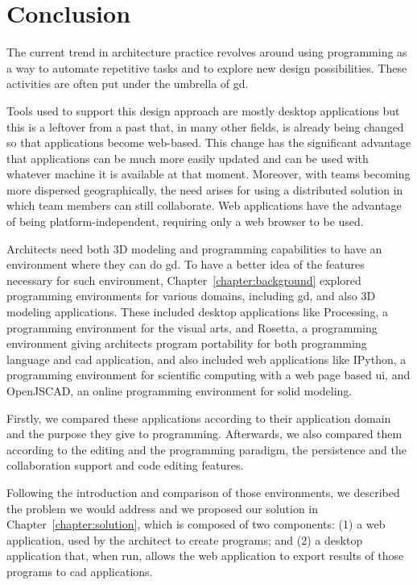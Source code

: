 
\chapter{Conclusion}
\label{chapter:conclusion}
The current trend in architecture practice revolves around using programming as a way to automate repetitive tasks and to explore new design possibilities.
These activities are often put under the umbrella of \acrfull{gd}.

Tools used to support this design approach are mostly desktop applications but this is a leftover from a past that, in many other fields, is already being changed so that applications become web-based.
This change has the significant advantage that applications can be much more easily updated and can be used with whatever machine it is available at that moment.
Moreover, with teams becoming more dispersed geographically, the need arises for using a distributed solution in which team members can still collaborate.
Web applications have the advantage of being platform-independent, requiring only a web browser to be used.

Architects need both 3D modeling and programming capabilities to have an environment where they can do \gls{gd}.
To have a better idea of the features necessary for such environment, Chapter~\ref{chapter:background} explored programming environments for various domains, including \gls{gd}, and also 3D modeling applications.
These included desktop applications like Processing, a programming environment for the visual arts, and Rosetta, a programming environment giving architects program portability for both programming language and \gls{cad} application, and also included web applications like IPython, a programming environment for scientific computing with a web page based \gls{ui}, and OpenJSCAD, an online programming environment for solid modeling.

Firstly, we compared these applications according to their application domain and the purpose they give to programming.
Afterwards, we also compared them according to the editing and the programming paradigm, the persistence and the collaboration support and code editing features.

Following the introduction and comparison of those environments, we described the problem we would address and we proposed our solution in Chapter~\ref{chapter:solution}, which is composed of two components:
(1) a web application, used by the architect to create programs;
and (2) a desktop application that, when run, allows the web application to export results of those programs to \gls{cad} applications.

